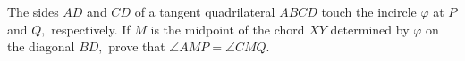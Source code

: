 The sides $AD$ and $CD$ of a tangent quadrilateral $ABCD$ touch the incircle $\varphi$ at $P$ and $Q,$ respectively. If $M$ is the midpoint of the chord $XY$ determined by $\varphi$ on the diagonal $BD,$ prove that $\angle AMP = \angle CMQ.$